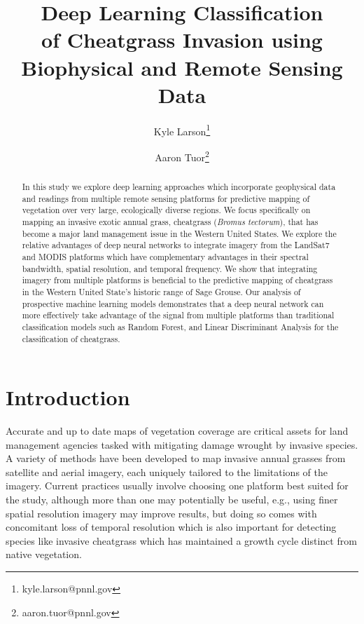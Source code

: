 \def\year{2017}\relax \documentclass[letterpaper]{article}
\title{Deep Learning Classification \\of Cheatgrass Invasion using \\Biophysical and Remote Sensing Data}
\author[1]{Kyle Larson\thanks{kyle.larson@pnnl.gov}}
\author[1]{Aaron Tuor\thanks{aaron.tuor@pnnl.gov}}
\affil[1]{Pacific Northwest National Laboratory}
\begin{document}
    \maketitle
	\tableofcontents

\begin{abstract} 
In this study we explore deep learning approaches which incorporate geophysical data and readings from multiple remote sensing platforms  for predictive mapping of vegetation over very large, ecologically diverse regions. We focus specifically on mapping an invasive exotic annual grass, cheatgrass ({\em Bromus tectorum}), that has become a major land management issue in the Western United States. We explore the relative advantages of deep neural networks to integrate imagery from the LandSat7 and MODIS platforms which have complementary advantages in their spectral bandwidth, spatial resolution, and temporal frequency. We show that integrating imagery from multiple platforms is beneficial to the predictive mapping of cheatgrass in the Western United State's historic range of Sage Grouse.  Our analysis of prospective machine learning models demonstrates that a deep neural network can more effectively take advantage of the signal from multiple platforms than traditional classification models such as Random Forest, and Linear Discriminant Analysis for the classification of cheatgrass.  
 \end{abstract}

 \section{Introduction}
Accurate and up to date maps of vegetation coverage are critical assets for land management agencies tasked with mitigating damage wrought by invasive species. A variety of methods have been developed to map invasive annual grasses from satellite and aerial imagery, each uniquely tailored to the limitations of the imagery. Current practices usually involve choosing one platform best suited for the study, although more than one may potentially be useful, e.g.,  using finer spatial resolution imagery may improve
results, but doing so comes with concomitant loss of temporal resolution which is also important for
detecting species like invasive cheatgrass which has maintained a growth cycle distinct from native vegetation.
\end{document}

